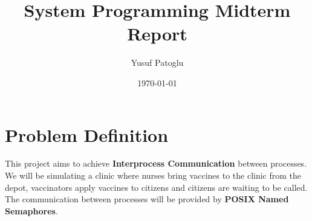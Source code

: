 \documentclass{article}
\title{System Programming Midterm Report}
\author{Yusuf Patoglu}
\date{\today}
\begin{document}
\maketitle

\section{Problem Definition}

    \quad This project aims to achieve \textbf{Interprocess Communication} between processes. We will be simulating a clinic where nurses bring vaccines to the clinic from the depot, vaccinators apply vaccines to citizens and citizens are waiting to be called. The communication between processes will be provided by \textbf{POSIX Named Semaphores}.
    
   
   
    
\end{document}
